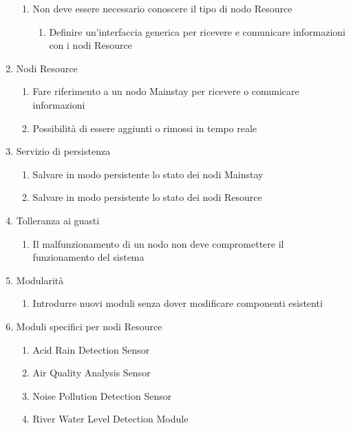 \begin{enumerate}
\begin{enumerate}
              \item Non deve essere necessario conoscere il tipo di nodo Resource
                    \begin{enumerate}
                        \item Definire un'interfaccia generica per ricevere e comunicare informazioni con i nodi Resource
                    \end{enumerate}
          \end{enumerate}
    \item Nodi Resource
          \begin{enumerate}
              \item Fare riferimento a un nodo Mainstay per ricevere o comunicare informazioni
              \item Possibilità di essere aggiunti o rimossi in tempo reale
          \end{enumerate}
    \item Servizio di persistenza
          \begin{enumerate}
              \item Salvare in modo persistente lo stato dei nodi Mainstay
              \item Salvare in modo persistente lo stato dei nodi Resource
          \end{enumerate}
    \item Tolleranza ai guasti
          \begin{enumerate}
              \item Il malfunzionamento di un nodo non deve compromettere il funzionamento del sistema
          \end{enumerate}
    \item Modularità
          \begin{enumerate}
              \item Introdurre nuovi moduli senza dover modificare componenti esistenti
          \end{enumerate}
    \item Moduli specifici per nodi Resource
          \begin{enumerate}
              \item Acid Rain Detection Sensor
              \item Air Quality Analysis Sensor
              \item Noise Pollution Detection Sensor
              \item River Water Level Detection Module
          \end{enumerate}
\end{enumerate}

